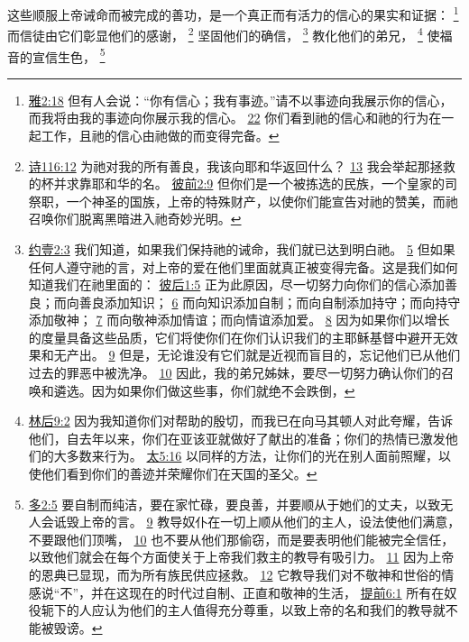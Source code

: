 \documentclass[12pt, a4paper, oneside]{ctexart}
\newcounter{parnum}[section]
\newcommand{\N}{%
   \noindent\refstepcounter{parnum}%
    \makebox[\parindent][l]{\textbf{\arabic{parnum}.}}}
\begin{document}
\N 这些顺服上帝诫命而被完成的善功，是一个真正而有活力的信心的果实和证据：
	\footnote {
		\href{https://biblehub.com/james/2-18.htm}{雅2:18} 但有人会说：“你有信心；我有事迹。”请不以事迹向我展示你的信心，而我将由我的事迹向你展示我的信心。
		\href{https://biblehub.com/james/2-22.htm}{22} 你们看到祂的信心和祂的行为在一起工作，且祂的信心由祂做的而变得完备。
	}
	而信徒由它们彰显他们的感谢，
	\footnote {
		\href{https://biblehub.com/psalms/116-12.htm}{诗116:12} 为祂对我的所有善良，我该向耶和华返回什么？
		\href{https://biblehub.com/psalms/116-13.htm}{13} 我会举起那拯救的杯并求靠耶和华的名。
		\href{https://biblehub.com/1_peter/2-9.htm}{彼前2:9} 但你们是一个被拣选的民族，一个皇家的司祭职，一个神圣的国族，上帝的特殊财产，以使你们能宣告对祂的赞美，而祂召唤你们脱离黑暗进入祂奇妙光明。
	}
	坚固他们的确信，
	\footnote {
		\href{https://biblehub.com/1_john/2-3.htm}{约壹2:3} 我们知道，如果我们保持祂的诫命，我们就已达到明白祂。
		\href{https://biblehub.com/1_john/2-5.htm}{5} 但如果任何人遵守祂的言，对上帝的爱在他们里面就真正被变得完备。这是我们如何知道我们在祂里面的：
		\href{https://biblehub.com/2_peter/1-5.htm}{彼后1:5} 正为此原因，尽一切努力向你们的信心添加善良；而向善良添加知识；
		\href{https://biblehub.com/2_peter/1-6.htm}{6} 而向知识添加自制；而向自制添加持守；而向持守添加敬神；
		\href{https://biblehub.com/2_peter/1-7.htm}{7} 而向敬神添加情谊；而向情谊添加爱。
		\href{https://biblehub.com/2_peter/1-8.htm}{8} 因为如果你们以增长的度量具备这些品质，它们将使你们在你们认识我们的主耶稣基督中避开无效果和无产出。
		\href{https://biblehub.com/2_peter/1-9.htm}{9} 但是，无论谁没有它们就是近视而盲目的，忘记他们已从他们过去的罪恶中被洗净。
		\href{https://biblehub.com/2_peter/1-10.htm}{10} 因此，我的弟兄姊妹，要尽一切努力确认你们的召唤和遴选。因为如果你们做这些事，你们就绝不会跌倒，
	}
	教化他们的弟兄，
	\footnote {
		\href{https://biblehub.com/2_corinthians/9-2.htm}{林后9:2} 因为我知道你们对帮助的殷切，而我已在向马其顿人对此夸耀，告诉他们，自去年以来，你们在亚该亚就做好了献出的准备；你们的热情已激发他们的大多数来行为。
		\href{https://biblehub.com/matthew/5-16.htm}{太5:16} 以同样的方法，让你们的光在别人面前照耀，以使他们看到你们的善迹并荣耀你们在天国的圣父。
	}
	使福音的宣信生色，
	\footnote {
		\href{https://biblehub.com/titus/2-5.htm}{多2:5} 要自制而纯洁，要在家忙碌，要良善，并要顺从于她们的丈夫，以致无人会诋毁上帝的言。
		\href{https://biblehub.com/titus/2-9.htm}{9} 教导奴仆在一切上顺从他们的主人，设法使他们满意，不要跟他们顶嘴，
		\href{https://biblehub.com/titus/2-10.htm}{10} 也不要从他们那偷窃，而是要表明他们能被完全信任，以致他们就会在每个方面使关于上帝我们救主的教导有吸引力。
		\href{https://biblehub.com/titus/2-11.htm}{11} 因为上帝的恩典已显现，而为所有族民供应拯救。
		\href{https://biblehub.com/titus/2-12.htm}{12} 它教导我们对不敬神和世俗的情感说“不”，并在这现在的时代过自制、正直和敬神的生活，
		\href{https://biblehub.com/1_timothy/6-1.htm}{提前6:1} 所有在奴役轭下的人应认为他们的主人值得充分尊重，以致上帝的名和我们的教导就不能被毁谤。
	}
\end{document}
